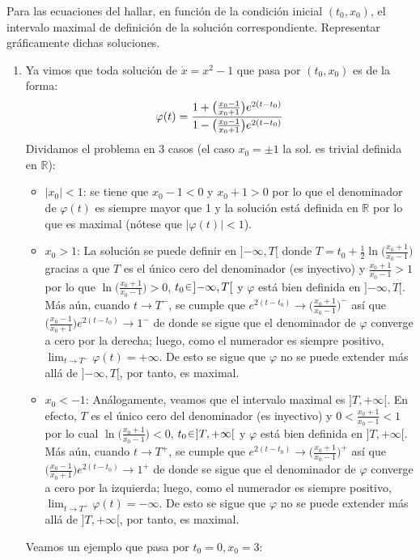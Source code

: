 \begin{ejer}
Para las ecuaciones del  hallar, en función de la condición
inicial $(t_0, x_0)$, el intervalo maximal de definición de la solución correspondiente.
Representar gráficamente dichas soluciones.
\end{ejer}
\begin{sol}
\begin{enumerate}[label = (\alph*)]
\item
Ya vimos que toda solución de $\dot{x} = x^2-1$ que pasa por $(t_0,x_0)$ es de la forma:
\[
    \varphi(t) = \frac{%
            1 + \big(\frac{x_0-1}{x_0+1}\big) e^{2(t-t_0)}
        }{%
            1 - \big(\frac{x_0-1}{x_0+1}\big) e^{2(t-t_0)}
        }
\]
Dividamos el problema en 3 casos (el caso $x_0 =\pm1$ la sol. es trivial definida en $\mathbb{R}$): 
    \begin{itemize}
    \item $|x_0| < 1$: se tiene que $x_0 - 1 < 0$ y $x_0 + 1 > 0$ por lo que el denominador de $\varphi(t)$
    es siempre mayor que 1 y la solución está definida en $\mathbb{R}$ por lo que es maximal (nótese que $|\varphi(t)| < 1$). 
    
    \item $x_0 > 1$: La solución se puede definir en $]{-\infty, T}[$ donde $T = t_0 + \frac12\ln\big(\frac{x_0+1}{x_0-1}\big)$ gracias a que $T$ es el único cero del denominador (es inyectivo) y $\frac{x_0+1}{x_0-1} > 1$ por lo que $\ln\big(\frac{x_0+1}{x_0-1}\big) > 0$, $t_0 \en {]{-\infty}, T[}$ y $\varphi$ está bien definida en $]{-\infty}, T[$. Más aún, cuando $t \to T^-$, se cumple que $e^{2(t-t_0)} \to \big(\frac{x_0 + 1}{x_0 - 1}\big)^-$ así que $\big(\frac{x_0-1}{x_0+1}\big) e^{2(t-t_0)} \to 1^-$ de donde se sigue que el denominador de $\varphi$ converge a cero por la derecha; luego, como el numerador es siempre positivo, 
    \(
        \lim_{t \to T^-} \varphi(t) = +\infty.
    \)
    De esto se sigue que $\varphi$ no se puede extender más allá de $]{-\infty}, T[$, por tanto, es maximal.
    
    \item $x_0 < -1$: Análogamente, veamos que el intervalo maximal es $]T, +\infty[$. En efecto, $T$ es el único cero del denominador (es inyectivo) y $0 < \frac{x_0+1}{x_0-1} < 1$ por lo cual $\ln\big(\frac{x_0+1}{x_0-1}\big) < 0$, $t_0 \en {]T, +\infty[}$ y $\varphi$ está bien definida en ${]T, +\infty[}$. Más aún, cuando $t \to T^+$, se cumple que $e^{2(t-t_0)} \to \big(\frac{x_0 + 1}{x_0 - 1}\big)^+$ así que $\big(\frac{x_0-1}{x_0+1}\big) e^{2(t-t_0)} \to 1^+$ de donde se sigue que el denominador de $\varphi$ converge a cero por la izquierda; luego, como el numerador es siempre positivo,
    \(
        \lim_{t \to T^+} \varphi(t) = -\infty.
    \)
    De esto se sigue que $\varphi$ no se puede extender más allá de ${]T, +\infty[}$, por tanto, es maximal.
    \end{itemize}
Veamos un ejemplo que pasa por $t_0=0, x_0=3$:



\end{enumerate}
\end{sol}
